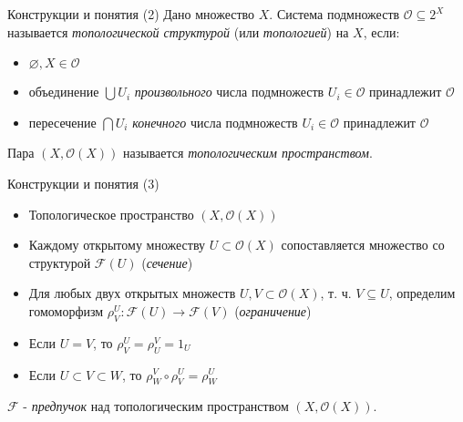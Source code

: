 \documentclass{beamer}
\begin{document}
\begin{frame}{Конструкции и понятия (2)}
Дано множество $X$. Система подмножеств $\mathcal{O} \subseteq 2^X$ называется \textit{топологической структурой} (или \textit{топологией}) на $X$, если:\\
\bigskip
\begin{itemize}
	\item $\varnothing, X \in \mathcal{O}$
	\item объединение $\bigcup U_i$ \textit{произвольного} числа подмножеств $U_i \in \mathcal{O}$ принадлежит $\mathcal{O}$
	\item пересечение $\bigcap U_i$ \textit{конечного} числа подмножеств $U_i \in \mathcal{O}$ принадлежит $\mathcal{O}$
\end{itemize}
\bigskip
Пара $(X, \mathcal{O}(X))$ называется \textit{топологическим пространством}.
\end{frame}

\begin{frame}{Конструкции и понятия (3)}
\begin{itemize}
	\item Топологическое пространство $(X, \mathcal{O}(X))$
	\item Каждому открытому множеству $U \subset \mathcal{O}(X)$ сопоставляется множество со структурой $\mathcal{F}(U)$ (\textit{сечение})
	\item Для любых двух открытых множеств $U, V \subset \mathcal{O}(X)$, т. ч. $V \subseteq U$, определим гомоморфизм $\rho^U_V : \mathcal{F}(U) \to \mathcal{F}(V)$ (\textit{ограничение})
	\item Если $U = V$, то $\rho^U_V = \rho^V_U = 1_U$
	\item Если $U \subset V \subset W$, то $\rho^V_W \circ \rho^U_V = \rho^U_W$
\end{itemize}
\bigskip
$\mathcal{F}$ - \textit{предпучок} над топологическим пространством $(X, \mathcal{O}(X))$.
\end{frame}
\end{document}
